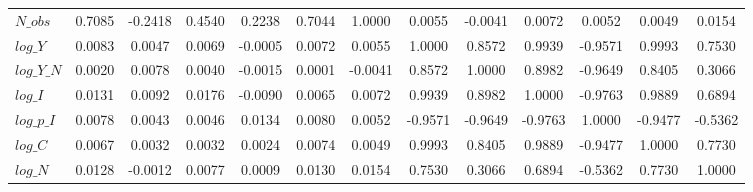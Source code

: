\begin{center}
\begin{longtable}{lcccccccccccc}
$N\_obs     $	 & 	       0.7085	 & 	      -0.2418	 & 	       0.4540	 & 	       0.2238	 & 	       0.7044	 & 	       1.0000	 & 	       0.0055	 & 	      -0.0041	 & 	       0.0072	 & 	       0.0052	 & 	       0.0049	 & 	       0.0154 \\ 
$log\_Y     $	 & 	       0.0083	 & 	       0.0047	 & 	       0.0069	 & 	      -0.0005	 & 	       0.0072	 & 	       0.0055	 & 	       1.0000	 & 	       0.8572	 & 	       0.9939	 & 	      -0.9571	 & 	       0.9993	 & 	       0.7530 \\ 
$log\_Y\_N  $	 & 	       0.0020	 & 	       0.0078	 & 	       0.0040	 & 	      -0.0015	 & 	       0.0001	 & 	      -0.0041	 & 	       0.8572	 & 	       1.0000	 & 	       0.8982	 & 	      -0.9649	 & 	       0.8405	 & 	       0.3066 \\ 
$log\_I     $	 & 	       0.0131	 & 	       0.0092	 & 	       0.0176	 & 	      -0.0090	 & 	       0.0065	 & 	       0.0072	 & 	       0.9939	 & 	       0.8982	 & 	       1.0000	 & 	      -0.9763	 & 	       0.9889	 & 	       0.6894 \\ 
$log\_p\_I  $	 & 	       0.0078	 & 	       0.0043	 & 	       0.0046	 & 	       0.0134	 & 	       0.0080	 & 	       0.0052	 & 	      -0.9571	 & 	      -0.9649	 & 	      -0.9763	 & 	       1.0000	 & 	      -0.9477	 & 	      -0.5362 \\ 
$log\_C     $	 & 	       0.0067	 & 	       0.0032	 & 	       0.0032	 & 	       0.0024	 & 	       0.0074	 & 	       0.0049	 & 	       0.9993	 & 	       0.8405	 & 	       0.9889	 & 	      -0.9477	 & 	       1.0000	 & 	       0.7730 \\ 
$log\_N     $	 & 	       0.0128	 & 	      -0.0012	 & 	       0.0077	 & 	       0.0009	 & 	       0.0130	 & 	       0.0154	 & 	       0.7530	 & 	       0.3066	 & 	       0.6894	 & 	      -0.5362	 & 	       0.7730	 & 	       1.0000 \\ 
\end{longtable}
 \end{center}
